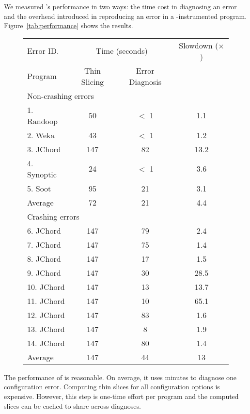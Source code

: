 We measured \ourtool's performance in two ways: the time cost
in diagnosing an error and the overhead introduced
in reproducing an error in a \ourtool-instrumented program.  Figure~\ref{tab:performance}
shows the results.

\begin{figure}[t]
\setlength{\tabcolsep}{.94\tabcolsep}
\small{
\begin{tabular}{|l|c|c|c|}
\hline
 Error ID. & \multicolumn{2}{|c|}{Time (seconds)} & Slowdown ($\times$)\\
\cline{2-3}
 Program & Thin Slicing & Error Diagnosis &  \\
 \hline
\hline
\multicolumn{4}{|l|}{Non-crashing errors}   \\
 \hline
 1. Randoop & 50 & $<$ 1 & 1.1\\
 2. Weka & 43 & $<$ 1 & 1.2 \\
 3. JChord & 147 & 82 & 13.2\\
 4. Synoptic & 24 & $<$ 1 & 3.6 \\
 5. Soot & 95 & 21 & 3.1 \\
\hline
Average & 72 & 21 & 4.4\\
\hline
\hline
\multicolumn{4}{|l|}{Crashing errors}   \\
\hline
 6. JChord & 147 & 79 & 2.4\\
 7. JChord & 147 & 75 & 1.4\\
 8. JChord & 147 & 17 &1.5\\
 9. JChord & 147 & 30 & 28.5\\
 10. JChord & 147 & 13 &13.7\\
 11. JChord & 147 & 10 &65.1 \\
 12. JChord & 147 & 83 &1.6\\
 13. JChord & 147 & 8 &1.9\\
 14. JChord & 147 & 80 &1.4\\
\hline
Average & 147 & 44 & 13\\
\hline
\end{tabular}
}
\end{figure}

The performance of \ourtool is reasonable.
On average, it uses \avgtime minutes to
diagnose one configuration error. Computing
thin slices for all configuration options
is expensive. However, this step is one-time effort
per program and the computed slices can be cached
to share across diagnoses. %

